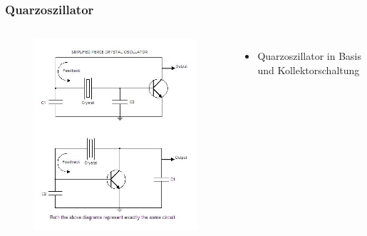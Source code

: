 \begin{frame}
  \frametitle{Quarzoszillator}
  \begin{columns}
    \begin{figure}
      \includegraphics[width=\textwidth,height=.7\textheight,keepaspectratio]{a07/PIERCE_CRYSTAL_OSCILLATOR.jpg}
    \end{figure}
    \begin{itemize}
      \item Quarzoszillator in Basis und Kollektorschaltung
    \end{itemize}
  \end{columns}
\end{frame}

